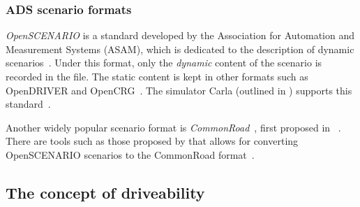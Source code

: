 
\subsubsection{ADS scenario formats}\label{sec:adsScenarioFormats}

\emph{OpenSCENARIO} is a standard developed by the Association for Automation and
Measurement Systems (ASAM), which is dedicated to the description of dynamic
scenarios~\cite[651]{generatingOpenScenario}. Under this format, only the
\textit{dynamic} content of the scenario is recorded in the file. The static
content is kept in other formats such as OpenDRIVER and
OpenCRG~\cite[652]{generatingOpenScenario}. The simulator Carla (outlined in
) supports this
standard~\cite[652]{generatingOpenScenario}.

Another widely popular scenario format is
\emph{CommonRoad}~\cite[4941]{convOpenScenarioToCR}, first proposed in
~\cite{commonRoadOG}. There are tools such as those
proposed by \citeauthor{convOpenScenarioToCR} that allows for converting
OpenSCENARIO scenarios to the CommonRoad
format~\cite[4941]{convOpenScenarioToCR}.


\subsection{The concept of driveability}\label{sec:adsDriveability}

